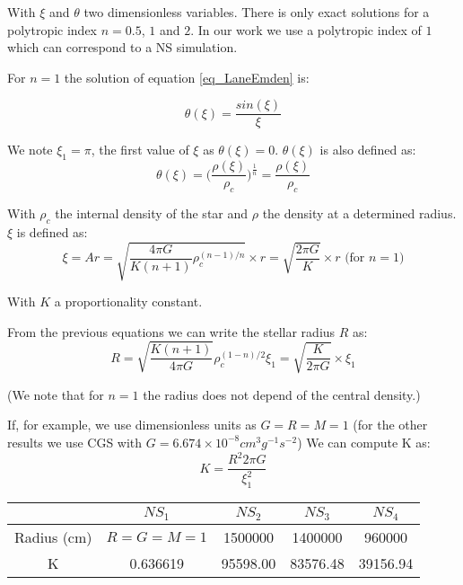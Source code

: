 \documentclass{article}
\begin{document}
With $\xi$ and $\theta$ two dimensionless variables.
There is only exact solutions for a polytropic index $n = 0.5$, $1$ and $2$.
In our work we use a polytropic index of $1$ which can correspond to a NS simulation.

For $n=1$ the solution of equation \ref{eq_LaneEmden} is:

\begin{equation}
\theta(\xi)=\frac{sin(\xi)}{\xi}
\end{equation}

We note $\xi_1 = \pi$, the first value of $\xi$ as $\theta(\xi) = 0$.
$\theta(\xi)$ is also defined as:
\begin{equation}
 \theta(\xi) = \Big(\frac{\rho(\xi)}{\rho_c}\Big)^{\frac{1}{n}}  = \frac{\rho(\xi)}{\rho_c}
\end{equation}

With $\rho_c$ the internal density of the star and $\rho$ the density at a determined radius. $\xi$ is defined as:
$$ \xi = Ar = \sqrt{\frac{4\pi G}{K(n+1)}\rho_c^{(n-1)/n}} \times r = \sqrt{\frac{2\pi G}{K}}\times r \mbox{ (for } n=1 \mbox{)}$$

With $K$ a proportionality constant.

From the previous equations we can write the stellar radius $R$ as:
\begin{equation}
R = \sqrt{\frac{K(n+1)}{4\pi G}}\rho_c^{(1-n)/2}\xi_1 = \sqrt{ \frac{K}{2\pi G} } \times \xi_1
\end{equation}

(We note that for $n=1$ the radius does not depend of the central density.)

If, for example, we use dimensionless units as $G=R=M=1$ (for the other results we use CGS with $G = 6.674 \times 10^{-8} cm^3g^{-1}s^{-2}$)
We can compute K as:
\begin{equation}
\label{eq:constant}
K = \frac{R^2  2 \pi G}{\xi_1^2}
\end{equation}

\begin{center}

\begin{tabular}{c|c|c|c|c|}
 & $NS_1$ & $NS_2$ & $NS_3$ & $NS_4$ \\
\hline
Radius (cm) & $R=G=M=1$ & 1500000 & 1400000 & 960000 \\
\hline
K & 0.636619 & 95598.00 & 83576.48 & 39156.94\\
\hline
\end{tabular}

\end{center}
\end{document}
